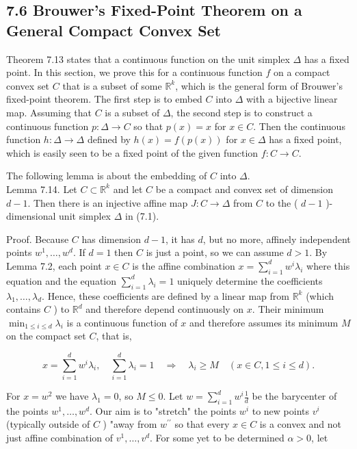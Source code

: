 \documentclass[12pt]{article}
\begin{document}
\subsection*{7.6 Brouwer's Fixed-Point Theorem on a General Compact Convex Set}
Theorem 7.13 states that a continuous function on the unit simplex $\Delta$ has a fixed point. In this section, we prove this for a continuous function $f$ on a compact convex set $C$ that is a subset of some $\mathbb{R}^{k}$, which is the general form of Brouwer's fixed-point theorem. The first step is to embed $C$ into $\Delta$ with a bijective linear map. Assuming that $C$ is a subset of $\Delta$, the second step is to construct a continuous function $p: \Delta \rightarrow C$ so that $p(x)=x$ for $x \in C$. Then the continuous function $h: \Delta \rightarrow \Delta$ defined by $h(x)=f(p(x))$ for $x \in \Delta$ has a fixed point, which is easily seen to be a fixed point of the given function $f: C \rightarrow C$.

The following lemma is about the embedding of $C$ into $\Delta$.\\
Lemma 7.14. Let $C \subset \mathbb{R}^{k}$ and let $C$ be a compact and convex set of dimension $d-1$. Then there is an injective affine map $J: C \rightarrow \Delta$ from $C$ to the ( $d-1$ )-dimensional unit simplex $\Delta$ in (7.1).

Proof. Because $C$ has dimension $d-1$, it has $d$, but no more, affinely independent points $w^{1}, \ldots, w^{d}$. If $d=1$ then $C$ is just a point, so we can assume $d>1$. By Lemma 7.2, each point $x \in C$ is the affine combination $x=\sum_{i=1}^{d} w^{i} \lambda_{i}$ where this equation and the equation $\sum_{i=1}^{d} \lambda_{i}=1$ uniquely determine the coefficients $\lambda_{1}, \ldots, \lambda_{d}$. Hence, these coefficients are defined by a linear map from $\mathbb{R}^{k}$ (which contains $C$ ) to $\mathbb{R}^{d}$ and therefore depend continuously on $x$. Their minimum $\min _{1 \leq i \leq d} \lambda_{i}$ is a continuous function of $x$ and therefore assumes its minimum $M$ on the compact set $C$, that is,


\begin{equation*}
x=\sum_{i=1}^{d} w^{i} \lambda_{i}, \quad \sum_{i=1}^{d} \lambda_{i}=1 \quad \Rightarrow \quad \lambda_{i} \geq M \quad(x \in C, 1 \leq i \leq d) . \tag{7.14}
\end{equation*}


For $x=w^{2}$ we have $\lambda_{1}=0$, so $M \leq 0$. Let $w=\sum_{i=1}^{d} w^{i} \frac{1}{d}$ be the barycenter of the points $w^{1}, \ldots, w^{d}$. Our aim is to "stretch" the points $w^{i}$ to new points $v^{i}$ (typically outside of $C$ ) "away from $w^{\prime \prime}$ so that every $x \in C$ is a convex and not just affine combination of $v^{1}, \ldots, v^{d}$. For some yet to be determined $\alpha>0$, let
\end{document}
